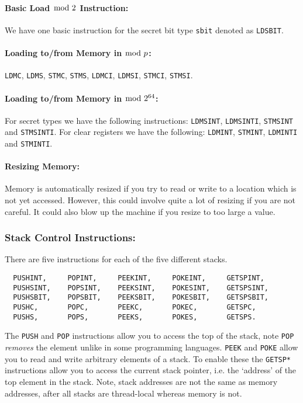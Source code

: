 \paragraph{Basic Load $\bmod \; 2$ Instruction:}
We have one basic instruction for the secret bit type \verb+sbit+ denoted as
\verb+LDSBIT+.

\paragraph{Loading to/from Memory in $\bmod \; p$:}
 \verb+LDMC+,
 \verb+LDMS+,
 \verb+STMC+,
 \verb+STMS+,
 \verb+LDMCI+,
 \verb+LDMSI+,
 \verb+STMCI+,
 \verb+STMSI+.

\paragraph{Loading to/from Memory in $\bmod \; 2^{64}$:}
For secret types we have the following instructions: \verb+LDMSINT+, \verb+LDMSINTI+, \verb+STMSINT+ and \verb+STMSINTI+. For clear registers we have the following: \verb+LDMINT+, \verb+STMINT+, \verb+LDMINTI+ and \verb+STMINTI+.

\paragraph{Resizing Memory:}
Memory is automatically resized if you try to read or write to
a location which is not yet accessed. However, this could involve
quite a lot of resizing if you are not careful. It could also
blow up the machine if you resize to too large a value.

\subsubsection{Stack Control Instructions:}
There are five instructions for each of the five different stacks.
\begin{verbatim}
  PUSHINT,     POPINT,     PEEKINT,     POKEINT,     GETSPINT,
  PUSHSINT,    POPSINT,    PEEKSINT,    POKESINT,    GETSPSINT,
  PUSHSBIT,    POPSBIT,    PEEKSBIT,    POKESBIT,    GETSPSBIT,
  PUSHC,       POPC,       PEEKC,       POKEC,       GETSPC,
  PUSHS,       POPS,       PEEKS,       POKES,       GETSPS.
\end{verbatim}
The \verb+PUSH+ and \verb+POP+ instructions allow you to access the top
of the stack, note \verb+POP+ {\em removes} the element unlike
in some programming languages.
\verb+PEEK+ and \verb+POKE+ allow you to read and write arbitrary elements
of a stack.
To enable these the \verb+GETSP*+ instructions allow you
to access the current stack pointer, i.e. the `address'
of the top element in the stack.
Note, stack addresses are not the same as memory addresses,
after all stacks are thread-local whereas memory is not.


